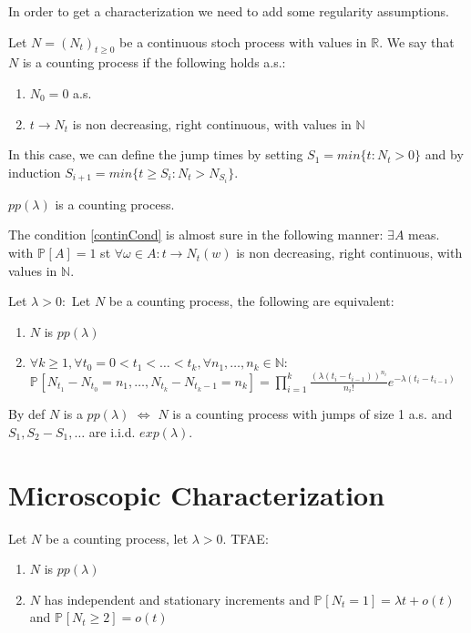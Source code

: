 In order to get a characterization we need to add some regularity assumptions.

\begin{defn}
	Let $N=(N_t)_{t \geq 0}$ be a continuous stoch process with values in $\mathbb{R}$. We say that $N$ is a counting process if the following holds a.s.:
\begin{enumerate}
	\item $N_0 = 0$ a.s.
	\item  $t \to N_t$ is non decreasing, right continuous, with values in $\mathbb{N}$ \label{continCond}
\end{enumerate}
In this case, we can define the jump times by setting $S_1=min\{t: N_t >0\}$ and by induction  $S_{i+1}= min\{t \geq S_i: N_t > N_{S_i}\}$.
\end{defn}

\begin{ex}[]
	$pp(\lambda )$ is a counting process.
\end{ex}

\begin{rmk}[]
	The condition \ref{continCond} is almost sure in the following manner: $\exists A$ meas. with $\mathbb{P}_{} \left[ A \right] =1$ st $\forall \omega \in A: t \to N_t(w)$ is non decreasing, right continuous, with values in $\mathbb{N}$.
\end{rmk}

\begin{theorem}[]
	Let $\lambda> 0:$ Let $N$ be a counting process, the following are equivalent:
\begin{enumerate}
	\item $N$ is $pp(\lambda)$
	\item $\forall k \geq 1, \forall t_0 =0 < t_1 < \ldots <t_k, \forall n_1, \ldots ,n_k \in \mathbb{N}:$ \\ $\mathbb{P}_{} \left[ N_{t_1}-N_{t_0}=n_1, \ldots ,N_{t_k}-N_{t_k-1}=n_k \right] = \prod_{i=1}^k \frac{(\lambda (t_i - t_{i-1}))^{n_i}}{n_i!} e^{-\lambda (t_i - t_{i-1})} $
\end{enumerate}

\end{theorem}

\begin{rmk}[]
	By def $N$ is a $pp(\lambda)$ $\iff $ $N$ is a counting process with jumps of size 1 a.s. and  $S_1,S_2-S_1, \ldots $ are i.i.d.  $exp(\lambda)$.
\end{rmk}

\section{Microscopic Characterization}
\begin{theorem}[]
	Let $N$ be a counting process, let $\lambda> 0$. TFAE:
\begin{enumerate}
	\item $N$ is $pp(\lambda)$ 
	\item $N$ has independent and stationary increments and $\mathbb{P}_{} \left[ N_t =1 \right] = \lambda t + o(t)$ and $\mathbb{P}_{} \left[ N_t \geq 2 \right] = o(t)$
\end{enumerate}

\end{theorem}

